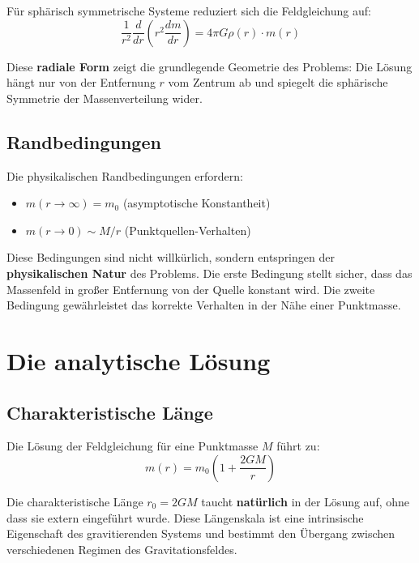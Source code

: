 \documentclass[12pt,a4paper]{report}
\begin{document}
	Für sphärisch symmetrische Systeme reduziert sich die Feldgleichung auf:
	\begin{equation}
		\frac{1}{r^2} \frac{d}{dr}\left(r^2 \frac{dm}{dr}\right) = 4\pi G \rho(r) \cdot m(r)
	\end{equation}
	
	Diese \textbf{radiale Form} zeigt die grundlegende Geometrie des Problems: Die Lösung hängt nur von der Entfernung $r$ vom Zentrum ab und spiegelt die sphärische Symmetrie der Massenverteilung wider.
	
	\subsection{Randbedingungen}
	
	Die physikalischen Randbedingungen erfordern:
	\begin{itemize}
		\item $m(r \to \infty) = m_0$ (asymptotische Konstantheit)
		\item $m(r \to 0) \sim M/r$ (Punktquellen-Verhalten)
	\end{itemize}
	
	Diese Bedingungen sind nicht willkürlich, sondern entspringen der \textbf{physikalischen Natur} des Problems. Die erste Bedingung stellt sicher, dass das Massenfeld in großer Entfernung von der Quelle konstant wird. Die zweite Bedingung gewährleistet das korrekte Verhalten in der Nähe einer Punktmasse.
	
	\section{Die analytische Lösung}
	
	\subsection{Charakteristische Länge}
	
	Die Lösung der Feldgleichung für eine Punktmasse $M$ führt zu:
	\begin{equation}
		m(r) = m_0\left(1 + \frac{2GM}{r}\right)
	\end{equation}
	
	Die charakteristische Länge $r_0 = 2GM$ taucht \textbf{natürlich} in der Lösung auf, ohne dass sie extern eingeführt wurde. Diese Längenskala ist eine intrinsische Eigenschaft des gravitierenden Systems und bestimmt den Übergang zwischen verschiedenen Regimen des Gravitationsfeldes.
	
\end{document}
